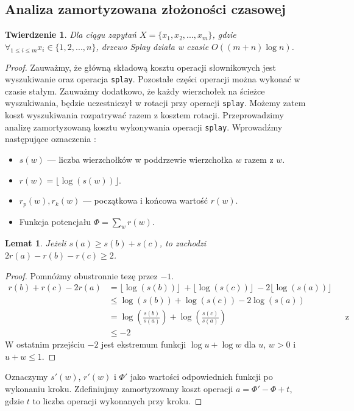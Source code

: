 \documentclass[declaration,shortabstract]{iithesis}
\newcounter{thm}[section]
\theoremstyle{thm}
\theoremstyle{remark}
\theoremstyle{plain}
\newtheorem{theorem}[thm]{Twierdzenie}
\theoremstyle{plain}
\theoremstyle{plain}
\newtheorem{lemma}[thm]{Lemat}
\begin{document}
\subsection{Analiza zamortyzowana złożoności czasowej} 
\begin{theorem} 
Dla ciągu zapytań $X = \{ x_1, x_2, ..., x_m\}$, gdzie \\\( \forall_{1\leq i \leq m} x_i \in \{1, 2,...,n\}\), drzewo Splay działa w czasie \( O((m+n)\log n)\). 
\end{theorem} 
\begin{proof} Zauważmy, że główną składową kosztu operacji słownikowych jest wyszukiwanie oraz operacja \texttt{splay}. Pozostałe części operacji można wykonać w czasie stałym. Zauważmy dodatkowo, że każdy wierzchołek na ścieżce wyszukiwania, będzie uczestniczył w rotacji przy operacji \texttt{splay}. Możemy zatem koszt wyszukiwania rozpatrywać razem z kosztem rotacji. Przeprowadzimy analizę zamortyzowaną kosztu wykonywania operacji \texttt{splay}. Wprowadźmy następujące oznaczenia : 
\begin{itemize} 
\item{\(s(w)\) --- liczba wierzchołków w poddrzewie wierzchołka \(w\) razem z $w$.} 
\item{\(r(w) = \lfloor \log(s(w)) \rfloor\).} 
\item{\(r_p(w), r_k(w)\) --- początkowa i końcowa wartość \(r(w)\).}
\item{Funkcja potencjału \(\Phi = \sum_w r(w)\).} 
\end{itemize}   
\begin{lemma}
\label{log_convex}
Jeżeli \(s(a) \geq s(b) + s(c)\), to zachodzi \(2r(a) - r(b) - r(c) \geq 2\).
\end{lemma}
\begin{proof}
Pomnóżmy obustronnie tezę przez $-1$.
\begin{align*}
r(b) + r(c) - 2r(a) &= \lfloor \log(s(b)) \rfloor\ + \lfloor \log(s(c)) \rfloor\ - 2\lfloor \log(s(a)) \rfloor\\\
&\leq \log(s(b)) + \log(s(c)) - 2\log(s(a))\\
&= \log(\frac{s(b)}{s(a)}) + \log(\frac{s(c)}{s(a)}) && \text{z własności logarytmu}\\
&\leq -2
\end{align*}
W ostatnim przejściu $-2$ jest ekstremum funkcji \(\log u + \log w\) dla $u$, $w > 0$ i $u + w \leq 1$. 
\end{proof}

Oznaczymy $s'(w)$, $r'(w)$ i $\Phi'$ jako wartości odpowiednich funkcji po wykonaniu kroku.
Zdefiniujmy zamortyzowany koszt operacji \(a = \Phi' - \Phi + t\), gdzie $t$ to liczba operacji wykonanych przy kroku.
 

\end{proof}
\end{document}
